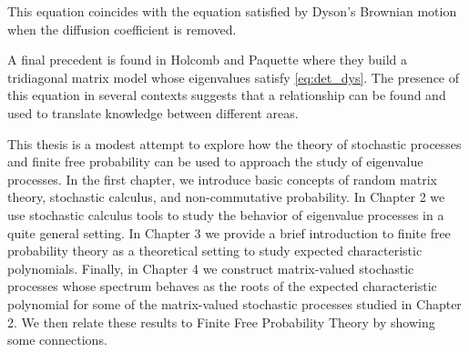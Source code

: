 This equation coincides with the equation satisfied by Dyson's Brownian motion when the diffusion coefficient is removed.

A final precedent is found in Holcomb and Paquette \cite{article:holcomb_paquette} where they build a tridiagonal matrix model whose eigenvalues satisfy \eqref{eq:det_dys}. The presence of this equation in several contexts suggests that a relationship can be found and used to translate knowledge between different areas.

This thesis is a modest attempt to explore how the theory of stochastic processes and finite free probability can be used to approach the study of eigenvalue processes. In the first chapter, we introduce basic concepts of random matrix theory, stochastic calculus, and non-commutative probability. In Chapter 2 we use stochastic calculus tools to study the behavior of eigenvalue processes in a quite general setting. In Chapter 3 we provide a brief introduction to finite free probability theory as a theoretical setting to study expected characteristic polynomials. Finally, in Chapter 4 we construct matrix-valued stochastic processes whose spectrum behaves as the roots of the expected characteristic polynomial for some of the matrix-valued stochastic processes studied in Chapter 2. We then relate these results to Finite Free Probability Theory by showing some connections. 